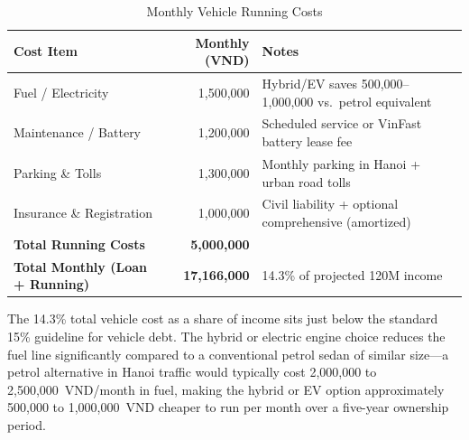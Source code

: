 \begin{table}[h!]
\caption{Monthly Vehicle Running Costs}
\label{tab:vehicle_tco}
\begin{tabularx}{\linewidth}{@{}lrL@{}}
\toprule
\textbf{Cost Item} & \textbf{Monthly (VND)} & \textbf{Notes} \\
\midrule
Fuel / Electricity      & 1,500,000 & Hybrid/EV saves 500,000--1,000,000 vs.\ petrol equivalent \\
Maintenance / Battery   & 1,200,000 & Scheduled service or VinFast battery lease fee \\
Parking \& Tolls        & 1,300,000 & Monthly parking in Hanoi + urban road tolls \\
Insurance \& Registration & 1,000,000 & Civil liability + optional comprehensive (amortized) \\
\midrule
\textbf{Total Running Costs} & \textbf{5,000,000} & \\
\textbf{Total Monthly (Loan + Running)} & \textbf{17,166,000} & 14.3\% of projected 120M income \\
\bottomrule
\end{tabularx}
\end{table}

The 14.3\% total vehicle cost as a share of income sits just below the standard 15\% guideline for vehicle debt. The hybrid or electric engine choice reduces the fuel line significantly compared to a conventional petrol sedan of similar size---a petrol alternative in Hanoi traffic would typically cost 2,000,000 to 2,500,000~VND/month in fuel, making the hybrid or EV option approximately 500,000 to 1,000,000~VND cheaper to run per month over a five-year ownership period.
